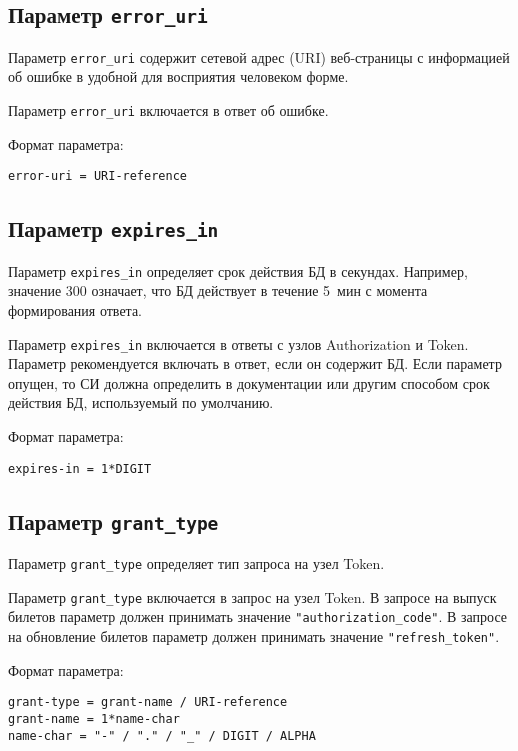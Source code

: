 \subsection{Параметр \lstinline{error_uri}}\label{PARAMS.ErrorUri}

Параметр \lstinline{error_uri} содержит сетевой адрес (URI) веб-страницы 
с информацией об ошибке в удобной для восприятия человеком форме.

Параметр \lstinline{error_uri} включается в ответ об ошибке.


Формат параметра:
\begin{lstlisting}
error-uri = URI-reference
\end{lstlisting}

\subsection{Параметр \lstinline{expires_in}}\label{PARAMS.ExpiresIn}

Параметр \lstinline{expires_in} определяет срок действия БД в секундах. 
%
Например, значение 300 означает, что БД действует в течение 5~мин с момента 
формирования ответа.

Параметр \lstinline{expires_in} включается в ответы с узлов Authorization и 
Token. 
%
Параметр рекомендуется включать в ответ, если он содержит БД.  
%
Если параметр опущен, то СИ должна определить в документации или другим способом
срок действия БД, используемый по умолчанию.

Формат параметра:
\begin{lstlisting}
expires-in = 1*DIGIT
\end{lstlisting}

\subsection{Параметр \lstinline{grant_type}}\label{PARAMS.GrantType}

Параметр \lstinline{grant_type} определяет тип запроса на узел Token.

Параметр \lstinline{grant_type} включается в запрос на узел Token.
%
В запросе на выпуск билетов параметр должен принимать значение 
\lstinline{"authorization_code"}.
%
В запросе на обновление билетов параметр должен принимать значение 
\lstinline{"refresh_token"}.

Формат параметра:
\begin{lstlisting}
grant-type = grant-name / URI-reference
grant-name = 1*name-char
name-char = "-" / "." / "_" / DIGIT / ALPHA
\end{lstlisting}

